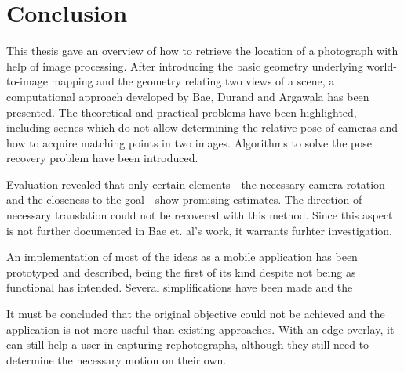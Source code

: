 \chapter{Conclusion}

This thesis gave an overview of how to retrieve the location of a photograph
with help of image processing. After introducing the basic geometry underlying
world-to-image mapping and the geometry relating two views of a scene, a
computational approach developed by Bae, Durand and Argawala has been presented.
The theoretical and practical problems have been
highlighted, including scenes which do not allow determining the relative pose
of cameras and how to acquire matching points in two images. Algorithms to solve
the pose recovery problem have been introduced.

Evaluation revealed that only certain elements---the necessary
camera rotation and the closeness to the goal---show promising estimates. The
direction of necessary translation could not be recovered with this method.
Since this aspect is not further documented in Bae et. al's work, it warrants
furhter investigation.

An implementation of most of the ideas as a mobile application has been prototyped and
described, being the first of its kind despite not being as functional has
intended. Several simplifications have been made and the 

It must be concluded that the original objective could not be achieved and
the application is not more useful than existing approaches. With an edge
overlay, it can still help a user in capturing rephotographs, although they
still need to determine the necessary motion on their own.
